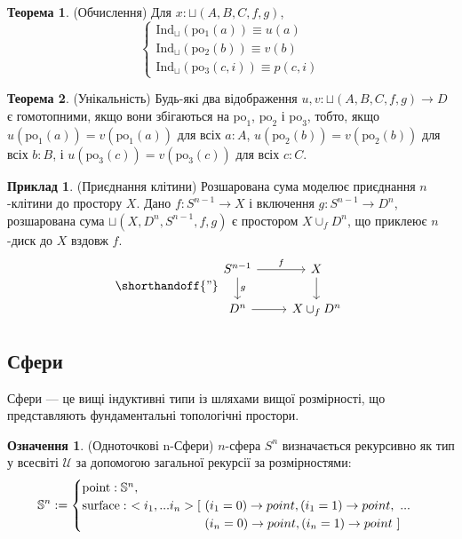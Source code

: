 \documentclass{article}
\theoremstyle{definition}
\newtheorem{theorem}{Теорема}
\newtheorem{definition}{Означення}
\newtheorem{example}{Приклад}
\begin{document}
\begin{theorem} (Обчислення)
Для \( x : \sqcup(A,B,C,f,g) \),
\[
\begin{cases}
\text{Ind$_\sqcup$}(\text{po$_1$}(a)) \equiv u(a) \\
\text{Ind$_\sqcup$}(\text{po$_2$}(b)) \equiv v(b) \\
\text{Ind$_\sqcup$}(\text{po$_3$}(c,i)) \equiv p(c,i)
\end{cases}
\]
\end{theorem}

\begin{theorem} (Унікальність)
Будь-які два відображення \( u, v : \sqcup(A,B,C,f,g) \to D \) є гомотопними,
якщо вони збігаються на \( \text{po}_1 \), \( \text{po}_2 \) і \( \text{po}_3 \), тобто,
якщо \( u(\text{po}_1(a)) = v(\text{po}_1(a)) \) для всіх \( a : A \), \( u(\text{po}_2(b)) = v(\text{po}_2(b)) \)
для всіх \( b : B \), і \( u(\text{po}_3(c)) = v(\text{po}_3(c)) \) для всіх \( c : C \).
\end{theorem}

\begin{example} (Приєднання клітини)
Розшарована сума моделює приєднання \( n \)-клітини до простору \( X \).
Дано \( f : S^{n-1} \to X \) і включення \( g : S^{n-1} \to D^n \),
розшарована сума \( \sqcup(X,D^n,S^{n-1},f,g) \) є
простором \( X \cup_f D^n \), що приклеює \( n \)-диск до \( X \) вздовж \( f \).
\[
\shorthandoff{"}
\begin{tikzcd}
S^{n-1} \arrow[r, "f"] \arrow[d, "g"] & X \arrow[d] \\
D^n \arrow[r] & X \cup_f D^n
\end{tikzcd}
\]
\end{example}

\subsection{Сфери}
Сфери — це вищі індуктивні типи із шляхами вищої розмірності,
що представляють фундаментальні топологічні простори.

\begin{definition} (Одноточкові n-Сфери)
\( n \)-сфера \( S^n \) визначається рекурсивно як тип у
всесвіті \( \mathcal{U} \) за допомогою загальної рекурсії за розмірностями:
\[
\mathbb{S}^n :=
\begin{cases}
\text{point} : \mathbb{S}^n, \\
\text{surface} :\ <i_1,...i_n> [\ (i_1=0) \rightarrow point, (i_1=1) \rightarrow point,\ ... \\
\hspace{3.47cm} (i_n=0) \rightarrow point, (i_n=1) \rightarrow point\ ]
\end{cases}
\]
\end{definition}
\end{document}
